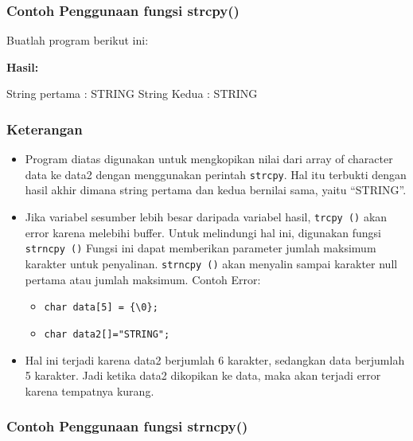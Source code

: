 {{\subsubsection*{Contoh Penggunaan fungsi strcpy()}

Buatlah program berikut ini:



\textbf{Hasil:}
\begin{lcverbatim}
String pertama : STRING
String Kedua : STRING
\end{lcverbatim}


\subsubsection*{Keterangan}

\begin{itemize}
\item
 Program diatas digunakan untuk mengkopikan nilai dari array of
 character data ke data2 dengan menggunakan perintah \texttt{strcpy}.
 Hal itu terbukti dengan hasil akhir dimana string pertama dan kedua
 bernilai sama, yaitu ``STRING''.
\item
 Jika variabel sesumber lebih besar daripada variabel hasil,
 \texttt{trcpy\ ()} akan error karena melebihi buffer. Untuk melindungi
 hal ini, digunakan fungsi \texttt{strncpy\ ()} Fungsi ini dapat
 memberikan parameter jumlah maksimum karakter untuk penyalinan.
 \texttt{strncpy\ ()} akan menyalin sampai karakter null pertama atau
 jumlah maksimum. Contoh Error:

 \begin{itemize}

 \item
 \texttt{char\ data{[}5{]}\ =\ \{\textquotesingle{}\textbackslash{}0\textquotesingle{}\};}
 \item
 \texttt{char\ data2{[}{]}="STRING";}
 \end{itemize}
\item
 Hal ini terjadi karena data2 berjumlah 6 karakter, sedangkan data
 berjumlah 5 karakter. Jadi ketika data2 dikopikan ke data, maka akan
 terjadi error karena tempatnya kurang.
\end{itemize}

\subsubsection*{Contoh Penggunaan fungsi strncpy()}

}}
